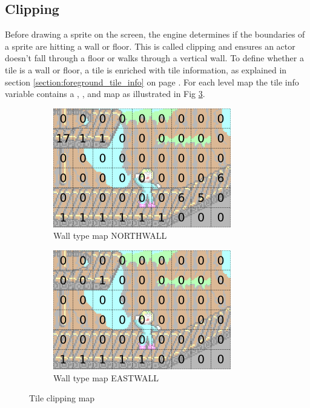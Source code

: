 \documentclass[book.tex]{subfiles}
\begin{document}
\subsection{Clipping}
\label{section:clipping}
Before drawing a sprite on the screen, the engine determines if the boundaries of a sprite are hitting a wall or floor. This is called clipping and ensures an actor doesn't fall through a floor or walks through a vertical wall. To define whether a tile is a wall or floor, a tile is enriched with tile information, as explained in section \ref{section:foreground_tile_info} on page \pageref{section:foreground_tile_info}. For each level map the tile info variable  contains a , ,  and  map as illustrated in Fig \ref{fig:clip_tinf}.\\


\begin{figure}[H]
\centering
\begin{subfigure}{.5\textwidth}
  \centering
  \includegraphics[width=.9\textwidth]{screenshots_300dpi/game/clip_tinf_1.png}
  \caption{Wall type map NORTHWALL}
  \label{fig:clip_tinf_n}
\end{subfigure}%
\begin{subfigure}{.5\textwidth}
  \centering
  \includegraphics[width=.9\textwidth]{screenshots_300dpi/game/clip_tinf_east.png}
  \caption{Wall type map EASTWALL}
  \label{fig:clip_tinf_e}
\end{subfigure}
\caption{Tile clipping map}
\label{fig:clip_tinf}
\end{figure}
\end{document}
